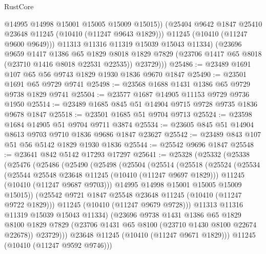 \begin{lexlean}{RustCore}
\begin{coremodule}
                @14995
                @14998
                @15001
                @15005
                @15009
                @15015))
            (@25404 @9642 @1847 @25410 @23648 @11245 (@10410 (@11247 @9643 @1829)))
            @11245
            (@10410 (@11247 @9600 @9649)))
          @11313
          @11316
          @11319
          @15039
          @15043
          @11334)
        (@23696
          @9659
          @1417
          @1386
          @65
          @1829
          @8018
          @1829
          @7829
          (@23706 @1417 @65 @8018 (@23710 @1416 @8018 @22531 @22535))
          @23729)))
@25486 := @23489 @1691 @107 @65 @56 @9743 @1829 @1930 @1836 @9670 @1847
@25490 := @23501 @1691 @65 @9729 @9741
@25498 := @23568 @1688 @1431 @1386 @65 @9729 @9738 @1829 @9741
@25504 := @23577 @1687 @14905 @11153 @9729 @9736 @1950
@25514 := @23489 @1685 @845 @51 @14904 @9715 @9728 @9735 @1836 @9678 @1847
@25518 := @23501 @1685 @51 @9704 @9713
@25524 := @23598 @1684 @14905 @51 @9704 @9711 @3874
@25534 := @23605 @845 @51 @14904 @8613 @9703 @9710 @1836 @9686 @1847 @23627
@25542 := @23489 @843 @107 @51 @56 @5142 @1829 @1930 @1836
@25544 := @25542 @9696 @1847
@25548 := @23641 @842 @5142 @17293 @17297
@25641 := @25328
    (@25332
      (@25338
        (@25476
          (@25486
            (@25490
              (@25498
                (@25504
                  (@25514
                    (@25518
                      (@25524
                        (@25534
                          (@25544 @25548 @23648 @11245 (@10410 (@11247 @9697 @1829)))
                          @11245
                          (@10410 (@11247 @9687 @9703)))
                        @14995
                        @14998
                        @15001
                        @15005
                        @15009
                        @15015))
                    (@25542 @9721 @1847 @25548 @23648 @11245 (@10410 (@11247 @9722 @1829)))
                    @11245
                    (@10410 (@11247 @9679 @9728)))
                  @11313
                  @11316
                  @11319
                  @15039
                  @15043
                  @11334)
                (@23696
                  @9738
                  @1431
                  @1386
                  @65
                  @1829
                  @8100
                  @1829
                  @7829
                  (@23706 @1431 @65 @8100 (@23710 @1430 @8100 @22674 @22678))
                  @23729)))
            @23648
            @11245
            (@10410 (@11247 @9671 @1829)))
          @11245
          (@10410 (@11247 @9592 @9746)))

\end{coremodule}
\end{lexlean}
